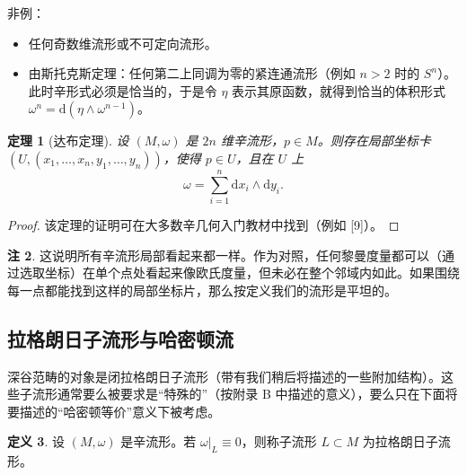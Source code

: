 \documentclass[11pt,a4paper]{article}
\theoremstyle{plain}
\newtheorem{theorem}{定理}[section]
\theoremstyle{definition}
\newtheorem{definition}[theorem]{定义}
\newtheorem{remark}[theorem]{注}
\begin{document}
非例：
\begin{itemize}
  \item 任何奇数维流形或不可定向流形。
  \item 由斯托克斯定理：任何第二上同调为零的紧连通流形（例如 $n>2$ 时的 $S^n$）。此时辛形式必须是恰当的，于是令 $\eta$ 表示其原函数，就得到恰当的体积形式 $\omega^n=\mathrm{d}(\eta\wedge\omega^{n-1})$。
\end{itemize}


\begin{theorem}[达布定理]
\sloppy
设 $(M,\omega)$ 是 $2n$ 维辛流形，$p\in M$。则存在局部坐标卡 $(U,(x_1,\ldots,x_n,y_1,\ldots,y_n))$，使得 $p\in U$，且在 $U$ 上
\[
\omega=\sum_{i=1}^n\mathrm{d}x_i\wedge\mathrm{d}y_i .
\]
\end{theorem}
\begin{proof}
该定理的证明可在大多数辛几何入门教材中找到（例如 [9]）。
\end{proof}

\begin{remark}
这说明所有辛流形局部看起来都一样。作为对照，任何黎曼度量都可以（通过选取坐标）在单个点处看起来像欧氏度量，但未必在整个邻域内如此。如果围绕每一点都能找到这样的局部坐标片，那么按定义我们的流形是平坦的。
\end{remark}

\subsection{拉格朗日子流形与哈密顿流}

深谷范畴的对象是闭拉格朗日子流形（带有我们稍后将描述的一些附加结构）。这些子流形通常要么被要求是“特殊的”（按附录 B 中描述的意义），要么只在下面将要描述的“哈密顿等价”意义下被考虑。

\begin{definition}
设 $(M,\omega)$ 是辛流形。若 $\omega|_L\equiv 0$，则称子流形 $L\subset M$ 为拉格朗日子流形。
\end{definition}
\end{document}
